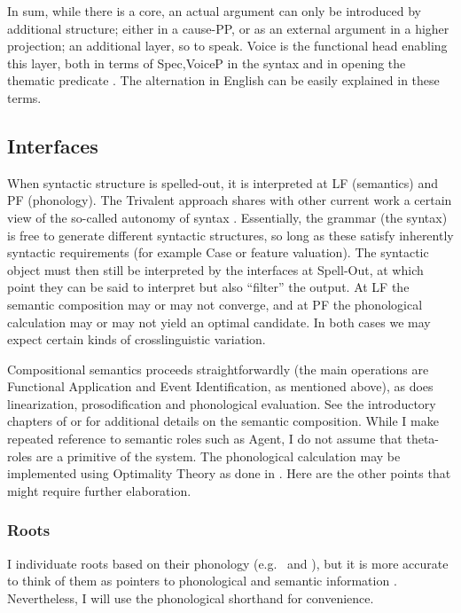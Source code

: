 \begin{exe}
\begin{xlist}
\begin{exe}
\begin{exe}
\begin{exe}
\begin{exe}
\begin{xlist}
\begin{exe}
\begin{xlist}
\begin{xlist}
\begin{xlist}
\begin{exe}
\begin{xlist}
\begin{exe}
\begin{exe}
\begin{xlist}
\begin{exe}
\begin{xlist}
\begin{exe}
\begin{exe}
\begin{xlist}
In sum, while there is a  core, an actual  argument can only be introduced by additional structure; either in a cause-PP, or as an external argument in a higher projection; an additional layer, so to speak. Voice is the functional head enabling this layer, both in terms of  Spec,VoiceP in the syntax and in opening the thematic predicate . The  alternation in English can be easily explained in these terms.

	\subsection{Interfaces} \label{intro:arch:inter}
When syntactic structure is spelled-out, it is interpreted at LF (semantics) and PF (phonology). The Trivalent approach shares with other current work a certain view of the so-called autonomy of syntax \citep{marantz13,wood15springer,woodmarantz17,myler17oup}. Essentially, the grammar (the syntax) is free to generate different syntactic structures, so long as these satisfy inherently syntactic requirements (for example Case  or feature valuation). The syntactic object must then still be interpreted by the interfaces at Spell-Out, at which point they can be said to interpret but also ``filter'' the output. At LF the semantic composition may or may not converge, and at PF the phonological calculation may or may not yield an optimal candidate. In both cases we may expect certain kinds of crosslinguistic variation.

\label{r1:2:3a}Compositional semantics proceeds straightforwardly (the main operations are Functional Application and Event Identification, as mentioned above), as does linearization, prosodification and phonological evaluation. See the introductory chapters of \cite{wood15springer} or \cite{myler16mit} for additional details on the semantic composition. While I make repeated reference to semantic roles such as Agent, I do not assume that theta-roles are a primitive of the system. The phonological calculation may be implemented using Optimality Theory \citep{ot} as done in \cite{kastner18nllt}. Here are the other points that might require further elaboration.

		\subsubsection{Roots}
I individuate roots based on their phonology (e.g.~ and ), but it is more accurate to think of them as pointers to phonological and semantic information \citep{harley14thlia,faust16,kastner18nllt}. Nevertheless, I will use the phonological shorthand for convenience.


\end{xlist}
\end{exe}
\end{exe}
\end{xlist}
\end{exe}
\end{xlist}
\end{exe}
\end{exe}
\end{xlist}
\end{exe}
\end{xlist}
\end{xlist}
\end{xlist}
\end{exe}
\end{xlist}
\end{exe}
\end{exe}
\end{exe}
\end{exe}
\end{xlist}
\end{exe}
